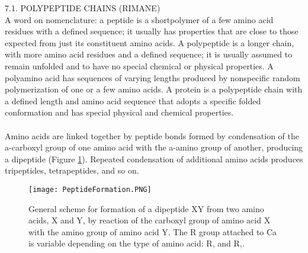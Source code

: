7.1. POLYPEPTIDE CHAINS (RIMANE)\\
A word on nomenclature: a peptide is a shortpolymer of a few amino acid residues with a defined sequence; it usually has properties that are close to those expected from just its constituent amino acids. A polypeptide is a longer chain, with more amino acid residues and a defined sequence; it is usually assumed to remain unfolded and to have no special chemical or physical properties. A polyamino acid has sequences of varying lengths produced by nonspecific random polymerization of one or a few amino acids. A protein is a polypeptide chain with a defined length and amino acid sequence that adopts a specific folded conformation and has special physical and chemical properties.\\
\\
Amino acids are linked together by peptide bonds formed by condensation of the a-carboxyl group
of one amino acid with the a-amino group of another, producing a dipeptide (Figure \ref{fig:PeptideFormation}). Repeated
condensation of additional amino acids produces tripeptides, tetrapeptides, and so on.

\begin{figure}[h]
\centering
\begin{minipage}[t]{0.8\textwidth}
\centering
\texttt{[image: PeptideFormation.PNG]}

\caption{\small{General scheme for formation of a dipeptide XY from two amino acids, X and Y, by reaction of the carboxyl group of amino acid X with the amino group of amino acid Y. The R group attached to Ca is variable depending on the type of amino acid: R, and R,\cite{creighton2010biophysical}.}}

\label{fig:PeptideFormation}
\end{minipage} 
\end{figure}


